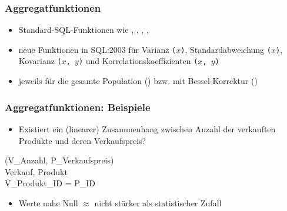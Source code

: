     \begin{frame}
    \frametitle{Aggregatfunktionen}
    
    \begin{itemize}
    \item Standard-SQL-Funktionen wie , , ,
      , 
    \item neue Funktionen in SQL:2003 für Varianz
      \texttt{($x$)}, Standardabweichung \texttt{($x$)},
      Kovarianz \texttt{($x$, $y$)}  und
      Korrelationskoeffizienten  \texttt{($x$, $y$)}
    \item jeweils für die gesamte Population () bzw. mit
      Bessel-Korrektur ()
    \end{itemize}
    
    \end{frame}
    
    
    \begin{frame}
    \frametitle{Aggregatfunktionen: Beispiele}
    
    \begin{itemize}
    \item Existiert ein (linearer) Zusammenhang zwischen Anzahl der
      verkauften Produkte und deren Verkaufspreis?
    \end{itemize}
    
    \begin{sql}
     (V\_Anzahl, P\_Verkaufspreis) \\
     Verkauf, Produkt \\
     V\_Produkt\_ID = P\_ID
    \end{sql}
    
    \begin{itemize}
    \item Werte nahe Null $\approx$ nicht stärker als statistischer Zufall
    \end{itemize}
    
    \end{frame}
    
    
